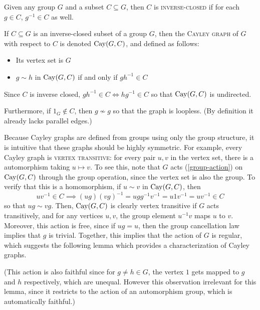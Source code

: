 \documentclass{report}
\begin{document}
    \begin{defn}\label{cayley-graph}
      Given any group $G$ and a subset $C \subseteq G$,
      then $C$ is \textsc{inverse-closed} if for each $g \in C$,
      $g^{-1} \in C$ as well.

      If $C \subseteq G$ is an inverse-closed subset of a group $G$,
      then the \textsc{Cayley graph} of $G$ with respect to $C$ is denoted
      $\operatorname{Cay}(G, C)$, and defined as follows:
      \begin{itemize}
        \item Its vertex set is $G$
        \item $g \sim h$ in $\operatorname{Cay}(G, C)$ if and only if $gh^{-1} \in C$
      \end{itemize}

      Since $C$ is inverse closed, $gh^{-1} \in C \iff hg^{-1} \in C$
      so that $\operatorname{Cay}(G, C)$ is undirected.

      Furthermore, if $1_G \not\in C$, then $g \not\sim g$ so that the graph is
      loopless.  (By definition it already lacks parallel edges.)
    \end{defn}

    Because Cayley graphs are defined from groups using only the group
    structure, it is intuitive that these graphs should be highly symmetric.
    For example, every Cayley graph is \textsc{vertex transitive}: for every
    pair $u, v$ in the vertex set, there is a automorphism taking $u \mapsto v$.
    To see this, note that $G$ acts (\ref{group-action}) on $\operatorname{Cay}(G, C)$ through
    the group operation, since the vertex set is also the group.
    To verify that this is a homomorphism, if $u \sim v$ in $\operatorname{Cay}(G, C)$, then 
    $$
      uv^{-1} \in C
      \implies (ug)(vg)^{-1} = ugg^{-1}v^{-1} = u 1 v^{-1} = u v^{-1} \in C
    $$
    so that $ug \sim vg$.
    Then, $\operatorname{Cay}(G, C)$ is clearly vertex transitive if $G$ acts transitively,
    and for any vertices $u, v$, the group element $u^{-1} v$ maps $u$ to $v$.
    Moreover, this action is free, since if $ug = u$, then the group
    cancellation law implies that $g$ is trivial.
    Together, this implies that the action of $G$ is regular,
    which suggests the following lemma which provides a characterization of
    Cayley graphs.

    (This action is also faithful since for $g \neq h \in G$, the vertex $1$
    gets mapped to $g$ and $h$ respectively, which are unequal.  However this
    observation irrelevant for this lemma, since it restricts to the action of
    an automorphism group, which is automatically faithful.)
\end{document}
